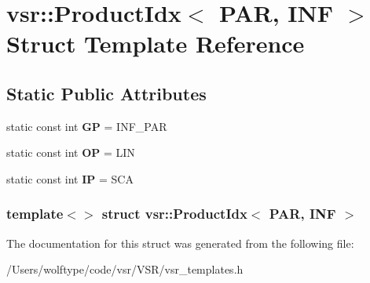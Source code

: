 \hypertarget{structvsr_1_1_product_idx_3_01_p_a_r_00_01_i_n_f_01_4}{\section{vsr\-:\-:Product\-Idx$<$ P\-A\-R, I\-N\-F $>$ Struct Template Reference}
\label{structvsr_1_1_product_idx_3_01_p_a_r_00_01_i_n_f_01_4}
}
\subsection*{Static Public Attributes}
\begin{DoxyCompactItemize}
\item 
\hypertarget{structvsr_1_1_product_idx_3_01_p_a_r_00_01_i_n_f_01_4_ad290de2e9c25cf52d8e904a86d9c204b}{static const int {\bfseries G\-P} = I\-N\-F\-\_\-\-P\-A\-R}\label{structvsr_1_1_product_idx_3_01_p_a_r_00_01_i_n_f_01_4_ad290de2e9c25cf52d8e904a86d9c204b}

\item 
\hypertarget{structvsr_1_1_product_idx_3_01_p_a_r_00_01_i_n_f_01_4_a9a5f1d80151893a2b676126da8d45cfd}{static const int {\bfseries O\-P} = L\-I\-N}\label{structvsr_1_1_product_idx_3_01_p_a_r_00_01_i_n_f_01_4_a9a5f1d80151893a2b676126da8d45cfd}

\item 
\hypertarget{structvsr_1_1_product_idx_3_01_p_a_r_00_01_i_n_f_01_4_a735be3a678ece27729a06b0f009b6bd7}{static const int {\bfseries I\-P} = S\-C\-A}\label{structvsr_1_1_product_idx_3_01_p_a_r_00_01_i_n_f_01_4_a735be3a678ece27729a06b0f009b6bd7}

\end{DoxyCompactItemize}
\subsubsection*{template$<$$>$ struct vsr\-::\-Product\-Idx$<$ P\-A\-R, I\-N\-F $>$}



The documentation for this struct was generated from the following file\-:\begin{DoxyCompactItemize}
\item 
/\-Users/wolftype/code/vsr/\-V\-S\-R/vsr\-\_\-templates.\-h\end{DoxyCompactItemize}
